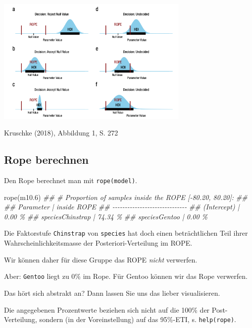 \documentclass[
  a4paper,
  DIV=11]{scrreprt}
\newenvironment{Shaded}{\begin{snugshade}}{\end{snugshade}}
\newcommand{\DocumentationTok}[1]{\textcolor[rgb]{0.37,0.37,0.37}{\textit{#1}}}
\newcommand{\FloatTok}[1]{\textcolor[rgb]{0.68,0.00,0.00}{#1}}
\newcommand{\FunctionTok}[1]{\textcolor[rgb]{0.28,0.35,0.67}{#1}}
\newcommand{\NormalTok}[1]{\textcolor[rgb]{0.00,0.23,0.31}{#1}}
\theoremstyle{definition}
\theoremstyle{remark}
\begin{document}
\includegraphics[width=0.7\textwidth,height=\textheight]{./img/Kruschke-2018-Fig1.png}

Kruschke (2018), Abbildung 1, S. 272

\hypertarget{rope-berechnen}{%
\subsection{Rope berechnen}\label{rope-berechnen}}

Den Rope berechnet man mit \texttt{rope(model)}.

\begin{Shaded}
\begin{Highlighting}[]
\FunctionTok{rope}\NormalTok{(m10}\FloatTok{.6}\NormalTok{)}
\DocumentationTok{\#\# \# Proportion of samples inside the ROPE [{-}80.20, 80.20]:}
\DocumentationTok{\#\# }
\DocumentationTok{\#\# Parameter        | inside ROPE}
\DocumentationTok{\#\# {-}{-}{-}{-}{-}{-}{-}{-}{-}{-}{-}{-}{-}{-}{-}{-}{-}{-}{-}{-}{-}{-}{-}{-}{-}{-}{-}{-}{-}{-}}
\DocumentationTok{\#\# (Intercept)      |      0.00 \%}
\DocumentationTok{\#\# speciesChinstrap |     74.34 \%}
\DocumentationTok{\#\# speciesGentoo    |      0.00 \%}
\end{Highlighting}
\end{Shaded}

Die Faktorstufe \texttt{Chinstrap} von \texttt{species} hat doch einen
beträchtlichen Teil ihrer Wahrscheinlichkeitsmasse der
Posteriori-Verteilung im ROPE.

Wir können daher für diese Gruppe das ROPE \emph{nicht} verwerfen.

Aber: \texttt{Gentoo} liegt zu 0\% im Rope. Für Gentoo können wir das
Rope verwerfen.

Das hört sich abstrakt an? Dann lassen Sie uns das lieber visualisieren.

\begin{tcolorbox}[enhanced jigsaw, left=2mm, colframe=quarto-callout-note-color-frame, opacityback=0, arc=.35mm, rightrule=.15mm, breakable, toptitle=1mm, colbacktitle=quarto-callout-note-color!10!white, colback=white, coltitle=black, bottomrule=.15mm, titlerule=0mm, opacitybacktitle=0.6, bottomtitle=1mm, title=\textcolor{quarto-callout-note-color}{\faInfo}\hspace{0.5em}{Hinweis}, toprule=.15mm, leftrule=.75mm]
Die angegebenen Prozentwerte beziehen sich nicht auf die 100\% der
Post-Verteilung, sondern (in der Voreinstellung) auf das 95\%-ETI, s.
\texttt{help(rope)}.
\end{tcolorbox}
\end{document}

